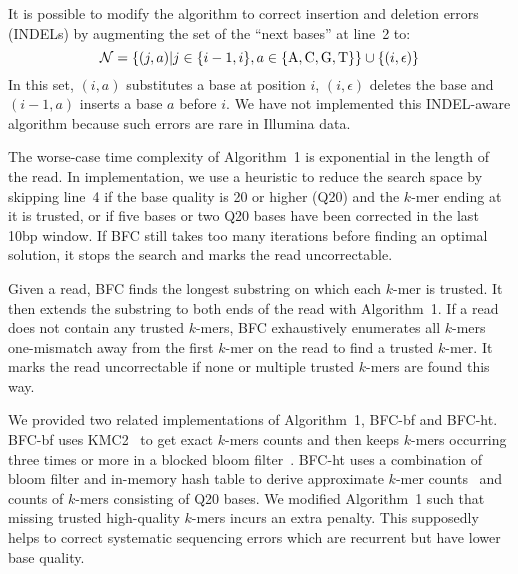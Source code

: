 \documentclass{bioinfo}
\begin{document}
\begin{methods}
It is possible to modify the algorithm to correct insertion and deletion
errors (INDELs) by augmenting the set of the ``next bases'' at line~2 to:
$$\mathcal{N}=\{(j,a)|j\in\{i-1,i\},a\in\{{\rm A},{\rm C},{\rm G},{\rm T}\}\}\cup\{(i,\epsilon)\}$$
In this set, $(i,a)$ substitutes a base at position $i$, $(i,\epsilon)$ deletes
the base and $(i-1,a)$ inserts a base $a$ before $i$. We have not
implemented this INDEL-aware algorithm because such
errors are rare in Illumina data.

The worse-case time complexity of Algorithm~1 is exponential in the length of
the read. In implementation, we use a heuristic to reduce the search space by
skipping line~4 if the base quality is 20 or higher (Q20) and the $k$-mer
ending at it is trusted, or if five bases or two Q20 bases have been corrected
in the last 10bp window. If BFC still takes too many iterations before finding
an optimal solution, it stops the search and marks the read uncorrectable.

Given a read, BFC finds the longest substring on which each $k$-mer is trusted. It
then extends the substring to both ends of the read with Algorithm~1. If a read
does not contain any trusted $k$-mers, BFC exhaustively enumerates all $k$-mers
one-mismatch away from the first $k$-mer on the read to find a trusted
$k$-mer. It marks the read uncorrectable if none or multiple trusted $k$-mers
are found this way.

We provided two related implementations of Algorithm~1, BFC-bf and BFC-ht.
BFC-bf uses KMC2~\citep{kmc2} to get exact $k$-mers counts and then keeps
$k$-mers occurring three times or more in a blocked bloom
filter~\citep{DBLP:conf/wea/PutzeSS07}. BFC-ht uses a combination of bloom
filter and in-memory hash table to derive approximate $k$-mer
counts~\citep{Melsted:2011bh} and counts of $k$-mers consisting of Q20 bases.
We modified Algorithm~1 such that missing trusted high-quality $k$-mers incurs
an extra penalty. This supposedly helps to correct systematic sequencing errors
which are recurrent but have lower base quality.


\end{methods}
\end{document}
